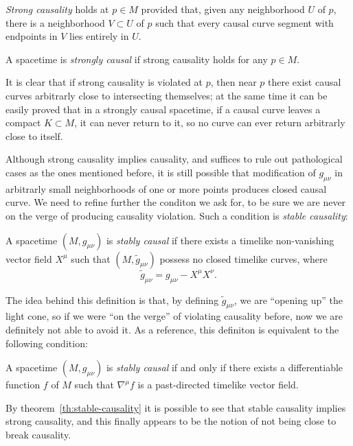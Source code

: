 \begin{definition}
	\emph{Strong causality} holds at \(p\in M\) provided that, given any neighborhood \(U\) of \(p\), there is a neighborhood \(V\subset U\) of \(p\) such that every causal curve segment with endpoints in \(V\) lies entirely in \(U\).

	\noindent A spacetime is \emph{strongly causal} if strong causality holds for any \(p\in M\).
\end{definition}

	It is clear that if strong causality is violated at \(p\), then near \(p\) there exist causal curves arbitrarly close to intersecting themselves; at the same time it can be easily proved that in a strongly causal spacetime, if a causal curve leaves a compact \(K\subset M\), it can never return to it, so no curve can ever return arbitrarly close to itself.

	Although strong causality implies causality, and suffices to rule out pathological cases as the ones mentioned before, it is still possible that modification of \(g_{\mu\nu}\) in arbitrarly small neighborhoods of one or more points produces closed causal curve. We need to refine further the conditon we ask for, to be sure we are never on the verge of producing causality violation. Such a condition is \emph{stable causality}:
	\begin{definition}
		A spacetime \((M, g_{\mu\nu})\) is \emph{stably causal} if there exists a timelike non-vanishing vector field \(X^{\mu}\) such that \((M, \tilde{g}_{\mu\nu})\) possess no closed timelike curves, where
		\[
			\tilde{g}_{\mu\nu}= g_{\mu\nu} - X^{\mu}X^{\nu}.
		\]
	\end{definition}
	The idea behind this definition is that, by defining \(\tilde{g}_{\mu\nu}\), we are ``opening up'' the light cone, so if we were ``on the verge'' of violating causality before, now we are definitely not able to avoid it. As a reference, this definiton is equivalent to the following condition:
	\begin{theorem}
		\label{th:stable-causality}
		A spacetime \((M, g_{\mu\nu})\) is \emph{stably causal} if and only if there exists a differentiable function \(f\) of \(M\) such that \(\nabla^{\mu}f\) is a past-directed timelike vector field.
	\end{theorem}
By theorem~\ref{th:stable-causality} it is possible to see that stable causality implies strong causality, and this finally appears to be the notion of not being close to break causality.

